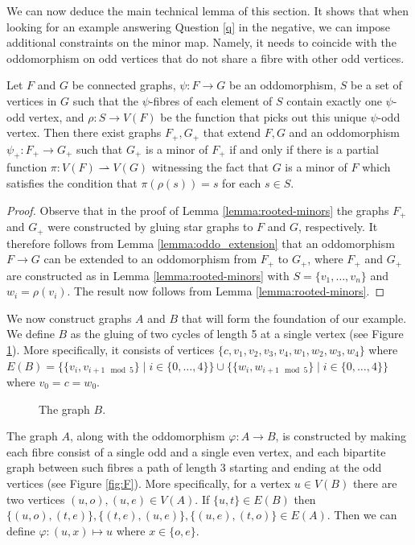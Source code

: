 \documentclass[11pt]{article}
\begin{document}
We can now deduce the main technical lemma of this section. It shows that when looking for an example answering Question \ref{q} in the negative, we can impose additional constraints on the minor map. Namely, it needs to coincide with the oddomorphism on odd vertices that do not share a fibre with other odd vertices.
\begin{lemma}
\label{lemma:labelled-minors}
    Let $F$ and $G$ be connected graphs, $\psi: F \to G$ be an oddomorphism, $S$ be a set of vertices in $G$ such that the $\psi$-fibres of each element of $S$ contain exactly one $\psi$-odd vertex, and $\rho: S \to V(F)$ be the function that picks out this unique $\psi$-odd vertex.
    Then there exist graphs $F_+,G_+$ that extend $F,G$ and an oddomorphism $\psi_+: F_+\to G_+$ such that $G_+$ is a minor of $F_+$ if and only if there is a partial function $\pi: V(F) \rightharpoonup V(G)$ witnessing the fact that $G$ is a minor of $F$ which satisfies the condition that $\pi(\rho(s)) = s$ for each $s \in S$.
\end{lemma}
\begin{proof} 
    Observe that in the proof of Lemma \ref{lemma:rooted-minors} the graphs $F_+$ and $G_+$ were constructed by gluing star graphs to $F$ and $G$, respectively. It therefore follows from Lemma \ref{lemma:oddo_extension} that an oddomorphism $F \to G$ can be extended to an oddomorphism from $F_+$ to $G_+$, where $F_+$ and $G_+$ are constructed as in Lemma \ref{lemma:rooted-minors} with $S = \{v_1,\ldots, v_n\}$ and $w_i = \rho(v_i)$. The result now follows from Lemma \ref{lemma:rooted-minors}.
\end{proof}

We now construct graphs $A$ and $B$ that will form the foundation of our example.
We define $B$ as the gluing of two cycles of length 5 at a single vertex (see Figure \ref{fig:G}). More specifically, it consists of vertices $\{c, v_1, v_2, v_3, v_4, w_1, w_2, w_3, w_4\}$ where $E(B) = \{ \{v_i, v_{i+1 \mod 5}\} \mid i \in \{0,\ldots, 4\}\} \cup \{ \{w_i, w_{i+1 \mod 5}\} \mid i \in \{0,\ldots, 4\}\}$ where $ v_0 = c = w_0$. 

\begin{figure}[htbp]
    \centering
    
    \caption{The graph $B$.}
    \label{fig:G}
\end{figure}
\par 
The graph $A$, along with the oddomorphism $\varphi:A \to B$, is constructed by making each fibre consist of a single odd and a single even vertex, and each bipartite graph between such fibres a path of length 3 starting and ending at the odd vertices (see Figure \ref{fig:F}). More specifically, for a vertex $u \in V(B)$ there are two vertices $(u,o), (u,e) \in V(A)$. If $\{u,t\} \in E(B)$ then $\{(u,o), (t,e)\}, \{(t,e), (u,e)\}, \{(u,e), (t,o)\} \in E(A)$. Then we can define $\varphi: (u,x) \mapsto u$ where $x \in \{o,e\}$.
\end{document}
